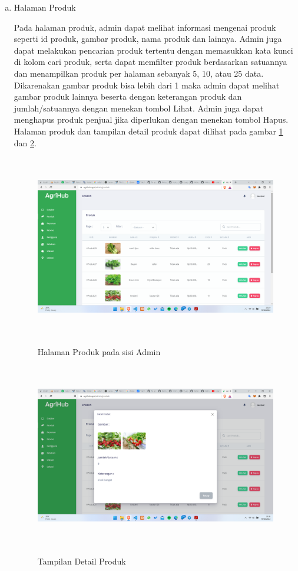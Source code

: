 \begin{enumerate}
\begin{enumerate}[a.]
		\item Halaman Produk
		\par Pada halaman produk, admin dapat melihat informasi mengenai produk seperti id produk, gambar produk, nama produk dan lainnya. Admin juga dapat melakukan pencarian produk tertentu dengan memasukkan kata kunci di kolom cari produk, serta dapat memfilter produk berdasarkan satuannya dan menampilkan produk per halaman sebanyak 5, 10, atau 25 data. Dikarenakan gambar produk bisa lebih dari 1 maka admin dapat melihat gambar produk lainnya beserta dengan keterangan produk dan jumlah/satuannya dengan menekan tombol Lihat. Admin juga dapat menghapus produk penjual jika diperlukan dengan menekan tombol Hapus. Halaman produk dan tampilan detail produk dapat dilihat pada gambar \ref*{produk_admin} dan \ref*{lihat_produk_admin}.
		\begin{figure}[H]
			\centering
			{\includegraphics [width = 13.5cm, height= 8cm]{gambar/admin/produk_admin}}
			\caption{Halaman Produk pada sisi Admin}
			\label{produk_admin}
		\end{figure}
		\begin{figure}[H]
			\centering
			{\includegraphics [width = 13.5cm, height= 8cm]{gambar/admin/lihat_produk_admin}}
			\caption{Tampilan Detail Produk}
			\label{lihat_produk_admin}
		\end{figure}


\end{enumerate}
\end{enumerate}
